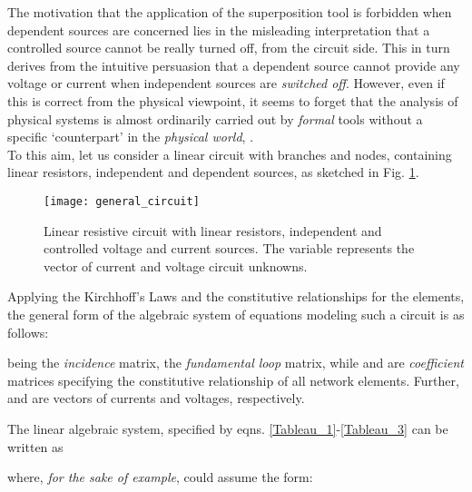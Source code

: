 \documentclass[10pt]{amsart}
\begin{document}
The motivation that the application of the superposition tool is forbidden when dependent sources are concerned lies in the misleading interpretation that a controlled source cannot be really turned off, from the circuit side. This in turn derives from the intuitive persuasion that a dependent source cannot provide any voltage or current when independent sources are \emph{switched off}. However, even if this is correct from the physical viewpoint, it seems to forget that the analysis of physical systems is almost ordinarily carried out by \emph{formal} tools without a specific `counterpart' in the \emph{physical world}, \cite{Damper_11}.\\
To this aim, let us consider a linear circuit with  branches and  nodes, containing linear resistors, independent and dependent sources, as sketched in Fig. \ref{fig:general_circuit}.
\begin{figure}[hb]
\centering
\texttt{[image: general\_circuit]}
\caption{Linear resistive circuit with linear resistors, independent and controlled voltage and current sources. The  variable represents the vector of current and voltage circuit unknowns.}
\label{fig:general_circuit}
\end{figure}
Applying the Kirchhoff's Laws and the constitutive relationships for the elements, the general form of the algebraic system of equations modeling such a circuit is as follows:

being  the  \emph{incidence} matrix,  the  \emph{fundamental loop} matrix, while  and  are  \emph{coefficient} matrices specifying the constitutive relationship of all network elements. Further,  and  are  vectors of currents and voltages, respectively. 

The  linear algebraic system, specified by eqns. \eqref{Tableau_1}-\eqref{Tableau_3} can be written as 

where, \emph{for the sake of example}, could assume the form:\\
\end{document}
